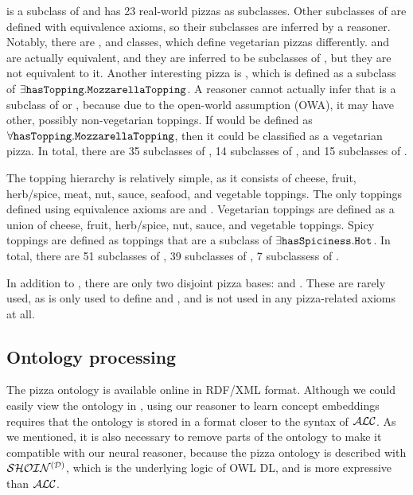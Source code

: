 is a subclass of  and has 23 real-world pizzas as subclasses.
Other subclasses of  are defined with equivalence axioms, so their subclasses are inferred by a reasoner.
Notably, there are ,  and  classes, which define vegetarian pizzas differently.
 and  are actually equivalent, and they are inferred to be subclasses of , but they are not equivalent to it.
Another interesting pizza is , which is defined as a subclass of $\exists \texttt{hasTopping} . \texttt{Mozzarella\-Topping}$.
A reasoner cannot actually infer that  is a subclass of  or , because due to the open-world assumption (OWA), it may have other, possibly non-vegetarian toppings.
If  would be defined as $\forall \texttt{hasTopping}. \texttt{Mozzarella\-Topping}$, then it could be classified as a vegetarian pizza. In total, there are 35 subclasses of , 14 subclasses of , and 15 subclasses of .

The topping hierarchy is relatively simple, as it consists of cheese, fruit, herb/spice, meat, nut, sauce, seafood, and vegetable toppings.
The only toppings defined using equivalence axioms are  and .
Vegetarian toppings are defined as a union of cheese, fruit, herb/spice, nut, sauce, and vegetable toppings.
Spicy toppings are defined as toppings that are a subclass of $\exists \texttt{hasSpiciness} . \texttt{Hot}$.
In total, there are 51 subclasses of , 39 subclasses of , 7 subclassess of .

In addition to , there are only two disjoint pizza bases:  and .
These are rarely used, as  is only used to define  and , and  is not used in any pizza-related axioms at all.


\subsection{Ontology processing}
\label{sec:pizza-preproc}

The pizza ontology is available online in RDF/XML format.
Although we could easily view the ontology in \Protege{}, using our reasoner to learn concept embeddings requires that the ontology is stored in a format closer to the syntax of $\mathcal{ALC}$.
As we mentioned, it is also necessary to remove parts of the ontology to make it compatible with our neural reasoner, because the pizza ontology is described with $\mathcal{SHOIN^{(D)}}$, which is the underlying logic of OWL DL, and is more expressive than $\mathcal{ALC}$.

